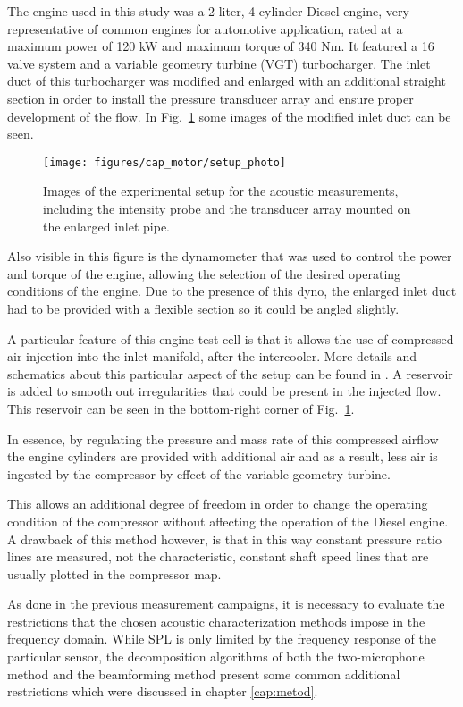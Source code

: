 The engine used in this study was a 2 liter, 4-cylinder Diesel engine, very representative of common engines for automotive application, rated at a maximum power of 120 kW and maximum torque of 340 Nm. It featured a 16 valve system and a variable geometry turbine (VGT) turbocharger. The inlet duct of this turbocharger was modified and enlarged with an additional straight section in order to install the pressure transducer array and ensure proper development of the flow. In Fig.~\ref{fig:setup_photo} some images of the modified inlet duct can be seen.

\begin{figure}[hbt!]
\centering
\texttt{[image: figures/cap\_motor/setup\_photo]}
\caption{Images of the experimental setup for the acoustic measurements, including the intensity probe and the transducer array mounted on the enlarged inlet pipe.}
\label{fig:setup_photo}
\end{figure}

Also visible in this figure is the dynamometer that was used to control the power and torque of the engine, allowing the selection of the desired operating conditions of the engine. Due to the presence of this dyno, the enlarged inlet duct had to be provided with a flexible section so it could be angled slightly.

A particular feature of this engine test cell is that it allows the use of compressed air injection into the inlet manifold, after the intercooler. More details and schematics about this particular aspect of the setup can be found in \cite{galindo2013engine,galindo2011measurement}. A reservoir is added to smooth out irregularities that could be present in the injected flow. This reservoir can be seen in the bottom-right corner of Fig.~\ref{fig:setup_photo}.

In essence, by regulating the pressure and mass rate of this compressed airflow the engine cylinders are provided with additional air and as a result, less air is ingested by the compressor by effect of the variable geometry turbine.

This allows an additional degree of freedom in order to change the operating condition of the compressor without affecting the operation of the Diesel engine. A drawback of this method however, is that in this way constant pressure ratio lines are measured, not the characteristic, constant shaft speed lines that are usually plotted in the compressor map.

As done in the previous measurement campaigns, it is necessary to evaluate the restrictions that the chosen acoustic characterization methods impose in the frequency domain. While SPL is only limited by the frequency response of the particular sensor, the decomposition algorithms of both the two-microphone method and the beamforming method present some common additional restrictions which were discussed in chapter \ref{cap:metod}.

